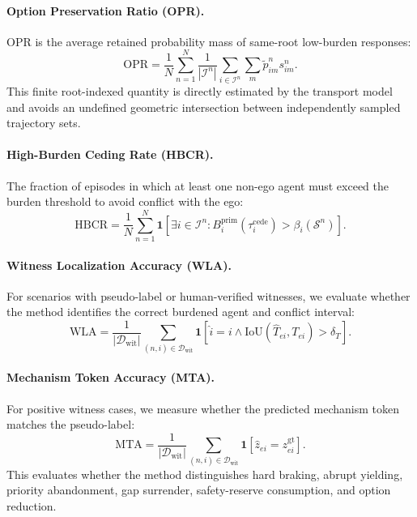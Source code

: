 \documentclass[10pt]{article}
\begin{document}
\paragraph{Option Preservation Ratio (OPR).}
OPR is the average retained probability mass of same-root low-burden responses:
\begin{equation}
    \mathrm{OPR}
    =
    \frac{1}{N}
    \sum_{n=1}^{N}
    \frac{1}{|\mathcal{I}^n|}
    \sum_{i\in\mathcal{I}^n}
    \sum_m \widetilde p^n_{im}s^n_{im}.
\end{equation}
This finite root-indexed quantity is directly estimated by the transport model and avoids an undefined geometric intersection between independently sampled trajectory sets.

\paragraph{High-Burden Ceding Rate (HBCR).}
The fraction of episodes in which at least one non-ego agent must exceed the burden threshold to avoid conflict with the ego:
\begin{equation}
    \mathrm{HBCR}
    =
    \frac{1}{N}
    \sum_{n=1}^{N}
    \mathbf{1}
    [
    \exists i\in\mathcal{I}^n:
    B_i^{\mathrm{prim}}(\tau_i^{\mathrm{cede}})>\beta_i(\mathcal{S}^n)
    ].
\end{equation}

\paragraph{Witness Localization Accuracy (WLA).}
For scenarios with pseudo-label or human-verified witnesses, we evaluate whether the method identifies the correct burdened agent and conflict interval:
\begin{equation}
    \mathrm{WLA}
    =
    \frac{1}{|\mathcal{D}_{\mathrm{wit}}|}
    \sum_{(n,i)\in\mathcal{D}_{\mathrm{wit}}}
    \mathbf{1}
    [
    \widehat{i}=i
    \wedge
    \mathrm{IoU}(\widehat{T}_{ei},T_{ei})>\delta_T
    ].
\end{equation}

\paragraph{Mechanism Token Accuracy (MTA).}
For positive witness cases, we measure whether the predicted mechanism token matches the pseudo-label:
\begin{equation}
    \mathrm{MTA}
    =
    \frac{1}{|\mathcal{D}_{\mathrm{wit}}|}
    \sum_{(n,i)\in\mathcal{D}_{\mathrm{wit}}}
    \mathbf{1}
    [
    \widehat{z}_{ei}=z^{\mathrm{gt}}_{ei}
    ].
\end{equation}
This evaluates whether the method distinguishes hard braking, abrupt yielding, priority abandonment, gap surrender, safety-reserve consumption, and option reduction.
\end{document}
